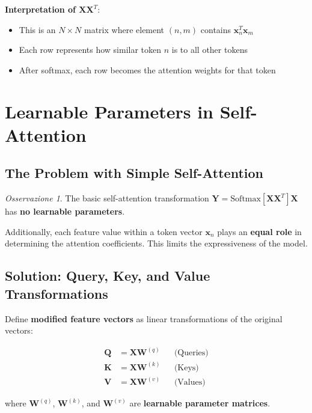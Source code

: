 \documentclass[11pt,a4paper]{article}
\theoremstyle{definition}
\theoremstyle{plain}
\theoremstyle{remark}
\newtheorem*{observation}{Osservazione}
\begin{document}
\textbf{Interpretation of $\mathbf{X}\mathbf{X}^T$}:
\begin{itemize}
    \item This is an $N \times N$ matrix where element $(n,m)$ contains $\mathbf{x}_n^T \mathbf{x}_m$
    \item Each row represents how similar token $n$ is to all other tokens
    \item After softmax, each row becomes the attention weights for that token
\end{itemize}

\section{Learnable Parameters in Self-Attention}

\subsection{The Problem with Simple Self-Attention}

\begin{observation}
The basic self-attention transformation $\mathbf{Y} = \text{Softmax}[\mathbf{X}\mathbf{X}^T]\mathbf{X}$ has \textbf{no learnable parameters}.

Additionally, each feature value within a token vector $\mathbf{x}_n$ plays an \textbf{equal role} in determining the attention coefficients. This limits the expressiveness of the model.
\end{observation}

\subsection{Solution: Query, Key, and Value Transformations}

\begin{tcolorbox}[colback=green!10!white,colframe=green!75!black,title=\textbf{Modified Feature Vectors}]
Define \textbf{modified feature vectors} as linear transformations of the original vectors:

\begin{align*}
\mathbf{Q} &= \mathbf{X}\mathbf{W}^{(q)} && \text{(Queries)} \\
\mathbf{K} &= \mathbf{X}\mathbf{W}^{(k)} && \text{(Keys)} \\
\mathbf{V} &= \mathbf{X}\mathbf{W}^{(v)} && \text{(Values)}
\end{align*}

where $\mathbf{W}^{(q)}$, $\mathbf{W}^{(k)}$, and $\mathbf{W}^{(v)}$ are \textbf{learnable parameter matrices}.
\end{tcolorbox}
\end{document}
